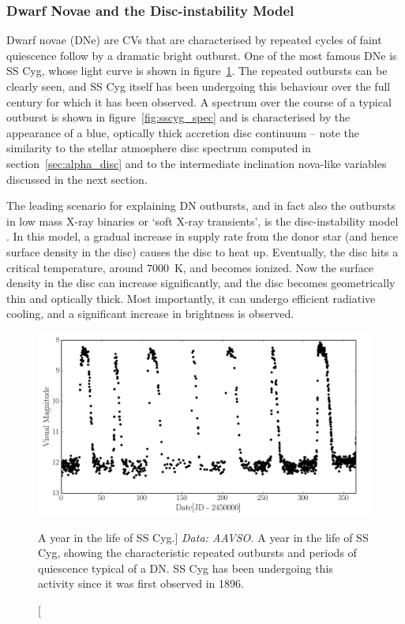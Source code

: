 \subsubsection{Dwarf Novae and the Disc-instability Model}

Dwarf novae (DNe) are CVs that are characterised 
by repeated cycles of faint quiescence follow by a dramatic bright 
outburst. One of the 
most famous DNe is SS Cyg, whose light curve is shown in 
figure~\ref{fig:sscyg}. The repeated outbursts can be clearly seen, and
SS Cyg itself has been undergoing this behaviour over the full century 
for which it has been observed. A spectrum over the course of a 
typical outburst is shown in figure~\ref{fig:sscyg_spec} 
and is characterised by the appearance of a blue, optically thick
accretion disc continuum -- note the similarity to the 
stellar atmosphere disc spectrum computed in section~\ref{sec:alpha_disc}
and to the intermediate inclination nova-like variables discussed in the next
section.

The leading scenario for explaining DN outbursts, and in fact also the outbursts
in low mass X-ray binaries or `soft X-ray transients',
is the disc-instability model 
\citep[DIM; ][]{osaki1974,lasota2001}. 
In this model, a gradual increase in supply rate from the donor star 
(and hence surface density in the disc) 
causes the disc to heat up. Eventually, the disc hits a critical temperature,
around $7000$~K, and becomes ionized. Now the surface density in the disc
can increase significantly, and the disc becomes geometrically thin and
optically thick. Most importantly, it can undergo efficient radiative
cooling, and a significant increase in brightness is observed.

\begin{figure}
\centering
\includegraphics[width=1.0\textwidth]{figures/01-intro/lc_sscyg.png}
\caption
[A year in the life of SS Cyg.]
{
{\sl Data: AAVSO.} 
A year in the life of SS Cyg, showing the characteristic repeated
outbursts and periods of quiescence typical of a DN. SS Cyg has been
undergoing this activity since it was first observed in 1896.
} 
\label{fig:sscyg}
\end{figure}

